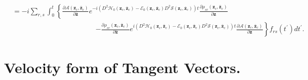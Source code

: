 \documentclass[aps,preprint]{revtex4}%
\begin{document}
\begin{align}
&  =-i\sum_{r,s}\int_{0}^{t}\left\{  \frac{\partial\mathcal{A}\left(
\mathbf{z}_{c},\mathbf{\bar{z}}_{c}\right)  }{\partial\mathbf{\bar{z}}%
}e^{-i\left(  D^{2}\mathcal{H}_{0}\left(  \mathbf{z}_{c},\mathbf{\bar{z}}%
_{c}\right)  -\mathcal{E}_{0}\left(  \mathbf{z}_{c},\mathbf{\bar{z}}%
_{c}\right)  D^{2}\mathcal{S}\left(  \mathbf{z}_{c},\mathbf{\bar{z}}%
_{c}\right)  \right)  t}\frac{\partial\rho_{sr}\left(  \mathbf{z}%
_{c},\mathbf{\bar{z}}_{c}\right)  }{\partial\mathbf{z}}\right. \\
&  \qquad\qquad\qquad\qquad\qquad\qquad\left.  -\frac{\partial\rho_{sr}\left(
\mathbf{z}_{c},\mathbf{\bar{z}}_{c}\right)  }{\partial\mathbf{\bar{z}}%
}e^{i\left(  D^{2}\mathcal{H}_{0}\left(  \mathbf{z}_{c},\mathbf{\bar{z}}%
_{c}\right)  -\mathcal{E}_{0}\left(  \mathbf{z}_{c},\mathbf{\bar{z}}%
_{c}\right)  D^{2}\mathcal{S}\left(  \mathbf{z}_{c},\mathbf{\bar{z}}%
_{c}\right)  \right)  t}\frac{\partial\mathcal{A}\left(  \mathbf{z}%
_{c},\mathbf{\bar{z}}_{c}\right)  }{\partial\mathbf{z}}\right\}  f_{rs}\left(
t^{\prime}\right)  dt^{\prime}.
\end{align}


\section{Velocity form of Tangent Vectors.\label{manifold}}
\end{document}
